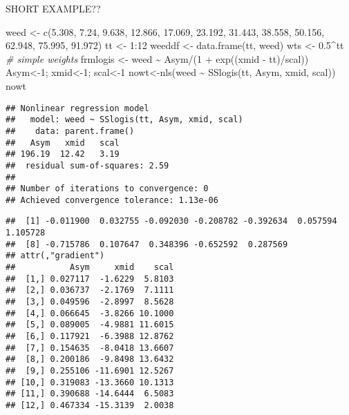 \documentclass[
]{article}
\newenvironment{Shaded}{\begin{snugshade}}{\end{snugshade}}
\newcommand{\CommentTok}[1]{\textcolor[rgb]{0.56,0.35,0.01}{\textit{#1}}}
\newcommand{\DecValTok}[1]{\textcolor[rgb]{0.00,0.00,0.81}{#1}}
\newcommand{\FloatTok}[1]{\textcolor[rgb]{0.00,0.00,0.81}{#1}}
\newcommand{\FunctionTok}[1]{\textcolor[rgb]{0.00,0.00,0.00}{#1}}
\newcommand{\NormalTok}[1]{#1}
\newcommand{\OtherTok}[1]{\textcolor[rgb]{0.56,0.35,0.01}{#1}}
\newcommand{\SpecialCharTok}[1]{\textcolor[rgb]{0.00,0.00,0.00}{#1}}
\begin{document}
SHORT EXAMPLE??

\begin{Shaded}
\begin{Highlighting}[]
\NormalTok{weed }\OtherTok{\textless{}{-}} \FunctionTok{c}\NormalTok{(}\FloatTok{5.308}\NormalTok{, }\FloatTok{7.24}\NormalTok{, }\FloatTok{9.638}\NormalTok{, }\FloatTok{12.866}\NormalTok{, }\FloatTok{17.069}\NormalTok{, }\FloatTok{23.192}\NormalTok{, }\FloatTok{31.443}\NormalTok{,}
          \FloatTok{38.558}\NormalTok{, }\FloatTok{50.156}\NormalTok{, }\FloatTok{62.948}\NormalTok{, }\FloatTok{75.995}\NormalTok{, }\FloatTok{91.972}\NormalTok{)}
\NormalTok{tt }\OtherTok{\textless{}{-}} \DecValTok{1}\SpecialCharTok{:}\DecValTok{12}
\NormalTok{weeddf }\OtherTok{\textless{}{-}} \FunctionTok{data.frame}\NormalTok{(tt, weed)}
\NormalTok{wts }\OtherTok{\textless{}{-}} \FloatTok{0.5}\SpecialCharTok{\^{}}\NormalTok{tt }\CommentTok{\# simple weights}
\NormalTok{frmlogis }\OtherTok{\textless{}{-}}\NormalTok{ weed }\SpecialCharTok{\textasciitilde{}}\NormalTok{ Asym}\SpecialCharTok{/}\NormalTok{(}\DecValTok{1} \SpecialCharTok{+} \FunctionTok{exp}\NormalTok{((xmid }\SpecialCharTok{{-}}\NormalTok{ tt)}\SpecialCharTok{/}\NormalTok{scal))}
\NormalTok{Asym}\OtherTok{\textless{}{-}}\DecValTok{1}\NormalTok{; xmid}\OtherTok{\textless{}{-}}\DecValTok{1}\NormalTok{; scal}\OtherTok{\textless{}{-}}\DecValTok{1}
\NormalTok{nowt}\OtherTok{\textless{}{-}}\FunctionTok{nls}\NormalTok{(weed }\SpecialCharTok{\textasciitilde{}} \FunctionTok{SSlogis}\NormalTok{(tt, Asym, xmid, scal))}
\NormalTok{nowt}
\end{Highlighting}
\end{Shaded}

\begin{verbatim}
## Nonlinear regression model
##   model: weed ~ SSlogis(tt, Asym, xmid, scal)
##    data: parent.frame()
##   Asym   xmid   scal 
## 196.19  12.42   3.19 
##  residual sum-of-squares: 2.59
## 
## Number of iterations to convergence: 0 
## Achieved convergence tolerance: 1.13e-06
\end{verbatim}

\begin{Shaded}
\end{Shaded}

\begin{verbatim}
##  [1] -0.011900  0.032755 -0.092030 -0.208782 -0.392634  0.057594  1.105728
##  [8] -0.715786  0.107647  0.348396 -0.652592  0.287569
## attr(,"gradient")
##           Asym     xmid    scal
##  [1,] 0.027117  -1.6229  5.8103
##  [2,] 0.036737  -2.1769  7.1111
##  [3,] 0.049596  -2.8997  8.5628
##  [4,] 0.066645  -3.8266 10.1000
##  [5,] 0.089005  -4.9881 11.6015
##  [6,] 0.117921  -6.3988 12.8762
##  [7,] 0.154635  -8.0418 13.6607
##  [8,] 0.200186  -9.8498 13.6432
##  [9,] 0.255106 -11.6901 12.5267
## [10,] 0.319083 -13.3660 10.1313
## [11,] 0.390688 -14.6444  6.5083
## [12,] 0.467334 -15.3139  2.0038
\end{verbatim}
\end{document}
